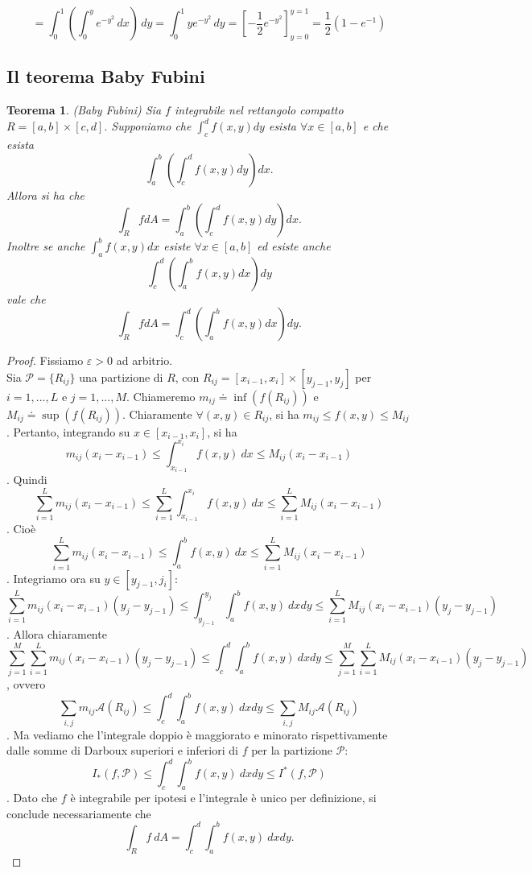 \documentclass[10pt]{article}
\theoremstyle{plain}
\newtheorem{thm}{Teorema}[section]
\theoremstyle{definition}
\begin{document}
$$= \int_0^1 \left( \int_0^y e^{-y^2}\,dx\right)\,dy = \int_0^1 ye^{-y^2} \,dy = \left[ -\frac{1}{2} e^{-y^2} \right]_{y=0}^{y=1} = \frac{1}{2} (1 - e^{-1})$$
\newline

\subsection{Il teorema Baby Fubini} \label{sec: babyfub}

\begin{thm} \label{th: baby_fubini}
 (Baby Fubini) Sia $f$ integrabile nel rettangolo compatto $R=[a,b]\times [c,d].$ Supponiamo che $\int_c^df(x,y)dy$ esista $\forall x\in [a,b]$ e che esista 
 $$\int_a^b \left (\int_c^d f(x,y)dy\right ) dx.$$
 Allora si ha che
 $$\int_RfdA= \int_a^b \left (\int_c^d f(x,y)dy\right ) dx.$$
 Inoltre se anche $\int_a^bf(x,y)dx$ esiste $\forall x\in [a,b]$ ed esiste anche
 $$\int_c^d \left (\int_a^b f(x,y)dx\right ) dy$$ vale che
 $$\int_RfdA= \int_c^d \left (\int_a^b f(x,y)dx\right ) dy.$$
\end{thm}

\begin{proof}
Fissiamo $\varepsilon>0$ ad arbitrio.
\\ Sia $\mathcal{P} = \{ R_{ij} \}$ una partizione di $R$, con $R_{ij}=[x_{i-1},x_i]\times[y_{j-1},y_j]$ per $i=1,...,L$ e $j=1,...,M$. Chiameremo $m_{ij}\doteq \inf(f(R_{ij}))$ e $M_{ij}\doteq \sup(f(R_{ij}))$.
Chiaramente $\forall (x,y)\in R_{ij}$, si ha $m_{ij}\leq f(x,y) \leq M_{ij}$.
Pertanto, integrando su $x \in [x_{i-1},x_i]$, si ha
$$m_{ij}(x_i-x_{i-1})\leq \int_{x_{i-1}}^{x_i} f(x,y)\ dx \leq M_{ij}(x_i-x_{i-1})$$.
Quindi
$$\sum_{i=1}^L m_{ij}(x_i-x_{i-1}) \leq \sum_{i=1}^L \int_{x_{i-1}}^{x_i} f(x,y)\ dx \leq \sum_{i=1}^L M_{ij}(x_i-x_{i-1})$$.
Cioè 
$$\sum_{i=1}^L m_{ij}(x_i-x_{i-1}) \leq \int_a^b f(x,y)\ dx \leq \sum_{i=1}^L M_{ij}(x_i-x_{i-1})$$.
Integriamo ora su $y \in [y_{j-1},j_i]$:
$$\sum_{i=1}^L m_{ij}(x_i-x_{i-1})(y_j-y_{j-1}) \leq \int_{y_{j-1}}^{y_j} \int_a^b f(x,y)\ dxdy \leq \sum_{i=1}^L M_{ij}(x_i-x_{i-1})(y_j-y_{j-1}) $$.
Allora chiaramente
$$\sum_{j=1}^M \sum_{i=1}^L m_{ij}(x_i-x_{i-1})(y_j-y_{j-1}) \leq \int_c^d \int_a^b f(x,y)\ dxdy \leq \sum_{j=1}^M  \sum_{i=1}^L M_{ij}(x_i-x_{i-1})(y_j-y_{j-1}) $$,
ovvero
$$\sum_{i,j} m_{ij} \mathcal{A}(R_{ij}) \leq \int_c^d \int_a^b f(x,y)\ dxdy \leq \sum_{i,j} M_{ij}\mathcal{A}(R_{ij})$$.
Ma vediamo che l'integrale doppio è maggiorato e minorato rispettivamente dalle somme di Darboux superiori e inferiori di $f$ per la partizione $\mathcal{P}$:
$$I_*(f, \mathcal{P}) \leq \int_c^d \int_a^b f(x,y)\ dxdy \leq I^*(f, \mathcal{P})$$.
Dato che $f$ è integrabile per ipotesi e l'integrale è unico per definizione, si conclude necessariamente che
$$\int_R f\ dA =  \int_c^d \int_a^b f(x,y)\ dxdy.$$

\end{proof}
\end{document}

